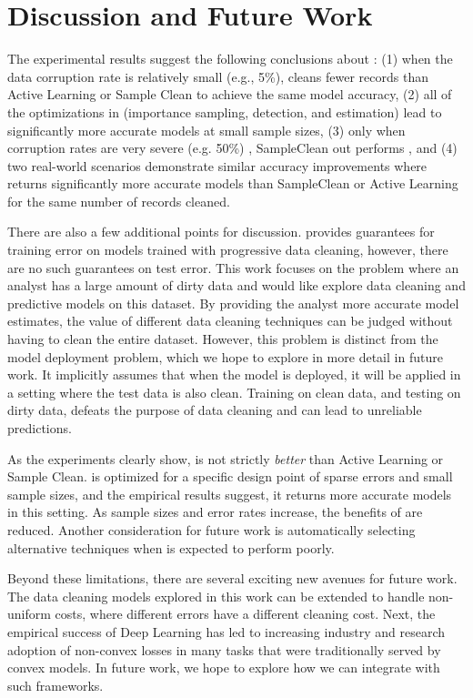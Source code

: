 \vspace{2em}\section{Discussion and Future Work}
The experimental results suggest the following conclusions about \sys: (1) when the data corruption rate is relatively small (e.g., 5\%), \sys cleans fewer records than Active Learning or Sample Clean to achieve the same model accuracy, (2) all of the optimizations in \sys (importance sampling, detection, and estimation) lead to significantly more accurate models at small sample sizes, (3) only when corruption rates are very severe (e.g. 50\%) , SampleClean out performs \sys, and (4) two real-world scenarios demonstrate similar accuracy improvements where \sys returns significantly more accurate models than SampleClean or Active Learning for the same number of records cleaned.

There are also a few additional points for discussion.
\sys provides guarantees for training error on models trained with progressive data cleaning, however, there are no such guarantees on test error. 
This work focuses on the problem where an analyst has a large amount of dirty data and would like explore data cleaning and predictive models on this dataset.
By providing the analyst more accurate model estimates, the value of different data cleaning techniques can be judged without having to clean the entire dataset.
However, this problem is distinct from the model deployment problem, which we hope to explore in more detail in future work.
It implicitly assumes that when the model is deployed, it will be applied in a setting where the test data is also clean.
Training on clean data, and testing on dirty data, defeats the purpose of data cleaning and can lead to unreliable predictions.

As the experiments clearly show, \sys is not strictly \emph{better} than Active Learning or Sample Clean.
\sys is optimized for a specific design point of sparse errors and small sample sizes, and the empirical results suggest, it returns more accurate models in this setting.
As sample sizes and error rates increase, the benefits of \sys are reduced.
Another consideration for future work is automatically selecting alternative techniques when \sys is expected to perform poorly.

Beyond these limitations, there are several exciting new avenues for future work.
The data cleaning models explored in this work can be extended to handle non-uniform costs, where different errors have a different cleaning cost.
Next, the empirical success of Deep Learning has led to increasing industry and research adoption of non-convex losses in many tasks that were traditionally served by convex models.
In future work, we hope to explore how we can integrate with such frameworks.

